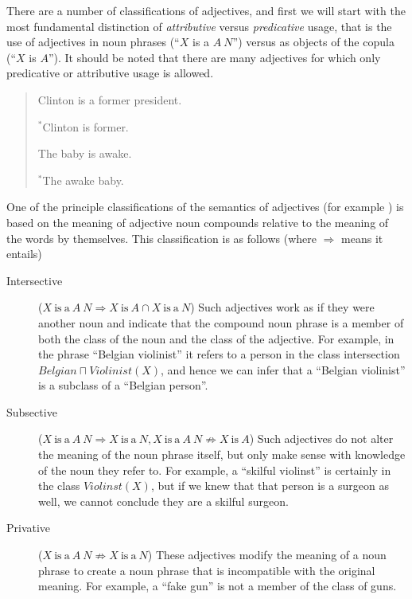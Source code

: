\documentclass[11pt]{article}
\begin{document}
There are a number of classifications of adjectives, and first we will start 
with the most fundamental distinction of \emph{attributive} versus 
\emph{predicative} usage, that is the use of adjectives in noun phrases 
(``$X$ is a $A~N$'') versus as objects of the copula (``$X$ is $A$''). 
It should be noted that there are many adjectives for which only predicative or 
attributive usage is allowed.

\begin{quote}
	Clinton is a former president.
	
	$^*$Clinton is former.
	
	The baby is awake.
	
	$^*$The awake baby.
\end{quote}

One of the principle classifications of the semantics of adjectives (for example \cite{partee2003there,bouillon1999description}) is based on the meaning of adjective noun compounds relative to the meaning of the words by themselves. This classification is as follows (where $\Rightarrow$ means it entails)

\begin{description}
\item[Intersective] ($X\mathrm{~is~a~}A~N \Rightarrow X\mathrm{~is~}A \cap X\mathrm{~is~a~}N$) 
Such adjectives work as if they were another noun and indicate that the compound 
noun phrase is a member of both the class of the noun and the class of the 
adjective. For example, in the phrase ``Belgian violinist'' it refers to a 
person in the class intersection $Belgian \sqcap Violinist(X)$, and hence we 
can infer that a ``Belgian violinist'' is a subclass of a ``Belgian person''.
\item[Subsective] ($X\mathrm{~is~a~}A~N \Rightarrow X\mathrm{~is~a~}N, X\mathrm{~is~a~}A~N \not\Rightarrow X\mathrm{~is~}A$) 
Such adjectives do not alter the meaning of the noun phrase itself, but only 
make sense with knowledge of the noun they refer to. For example, a ``skilful 
violinst'' is certainly in the class $Violinst(X)$, but if we knew that that 
person is a surgeon as well, we cannot conclude they are a skilful surgeon. 
\item[Privative] ($X\mathrm{~is~a~}A~N \not\Rightarrow X\mathrm{~is~a~}N$) 
These adjectives modify the meaning of a noun phrase to create a noun phrase 
that is incompatible with the original meaning. For example, a 
``fake gun'' is not a member of the class of guns.
\end{description}
\end{document}
